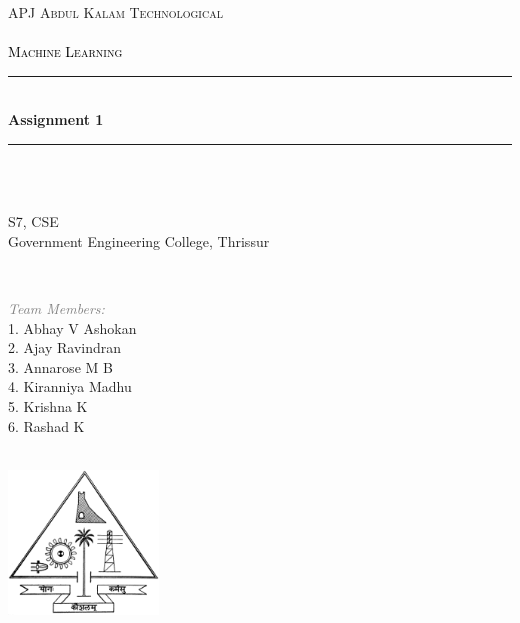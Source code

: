 \begin{titlepage}
\newcommand{\HRule}{\rule{\linewidth}{0.5mm}}


\center
    \textsc{\LARGE APJ Abdul Kalam Technological \\[0.3cm]}\\[1cm] 
    \textsc{\Large \textcolor{black}{Machine Learning}}\\[0.2cm]
    
    \HRule \\[0.4cm]
    { \huge \bfseries \textcolor{DeepMagenta}{Assignment 1}}\\[0.4cm]
    \HRule \\[1.5cm]
 
    \begin{minipage}{0.4\textwidth}
    \begin{flushleft} \large
    \emph{ }\\
    S7, CSE \\
    Government Engineering College, Thrissur
    \end{flushleft}
    \end{minipage}
    ~
    \begin{minipage}{0.4\textwidth}
    \begin{flushleft} \large
    \emph{\textcolor{gray}{Team Members:}} \\
    1. Abhay V Ashokan \\
    2. Ajay Ravindran \\
    3. Annarose M B \\
    4. Kiranniya Madhu \\
    5. Krishna K \\
    6. Rashad K
    \end{flushleft}
    \end{minipage}\\[4cm]


    \includegraphics[width=40mm,scale=0.5]{KTU_Logo.png}
\vfill 
\end{titlepage}
